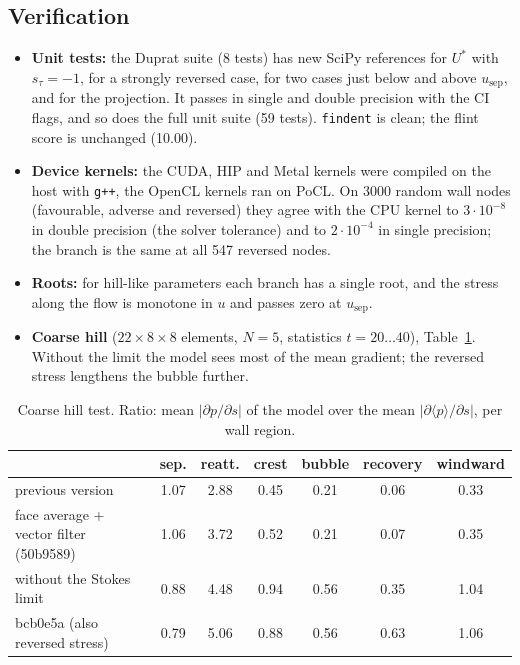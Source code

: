 \documentclass[11pt,a4paper]{article}
\newcommand{\code}[1]{\texttt{#1}}
\newcommand{\dpds}{\partial p/\partial s}
\begin{document}
\subsection{Verification}

\begin{itemize}
  \item \textbf{Unit tests:} the Duprat suite (8 tests) has new SciPy
    references for $U^*$ with $s_\tau = -1$, for a strongly reversed case,
    for two cases just below and above $u_\mathrm{sep}$, and for the
    projection. It passes in single and double
    precision with the CI flags, and so does the full unit suite (59
    tests). \code{findent} is clean; the flint score is unchanged (10.00).
  \item \textbf{Device kernels:} the CUDA, HIP and Metal kernels were
    compiled on the host with \code{g++}, the OpenCL kernels ran on PoCL.
    On 3000 random wall nodes (favourable, adverse and reversed) they agree
    with the CPU kernel to $3\cdot10^{-8}$ in double precision (the solver
    tolerance) and to $2\cdot10^{-4}$ in single precision; the branch is the
    same at all 547 reversed nodes.
  \item \textbf{Roots:} for hill-like parameters each branch has a single
    root, and the stress along the flow is monotone in $u$ and passes zero
    at $u_\mathrm{sep}$.
  \item \textbf{Coarse hill} ($22\times8\times8$ elements, $N = 5$,
    statistics $t = 20\ldots40$), Table~\ref{tab:dupv2coarse}. Without the
    limit the model sees most of the mean gradient; the reversed stress
    lengthens the bubble further.
\end{itemize}

\begin{table}[htbp]
\centering
\small
\caption{Coarse hill test. Ratio: mean $|\dpds|$ of the model over the mean
$|\partial\langle p\rangle/\partial s|$, per wall region.}
\label{tab:dupv2coarse}
\begin{tabular}{@{}lcccccc@{}}
\toprule
 & sep. & reatt. & crest & bubble & recovery & windward \\
\midrule
previous version & 1.07 & 2.88 & 0.45 & 0.21 & 0.06 & 0.33 \\
face average + vector filter (50b9589) & 1.06 & 3.72 & 0.52 & 0.21 & 0.07 & 0.35 \\
\quad without the Stokes limit & 0.88 & 4.48 & 0.94 & 0.56 & 0.35 & 1.04 \\
bcb0e5a (also reversed stress) & 0.79 & 5.06 & 0.88 & 0.56 & 0.63 & 1.06 \\
\bottomrule
\end{tabular}
\end{table}
\end{document}
